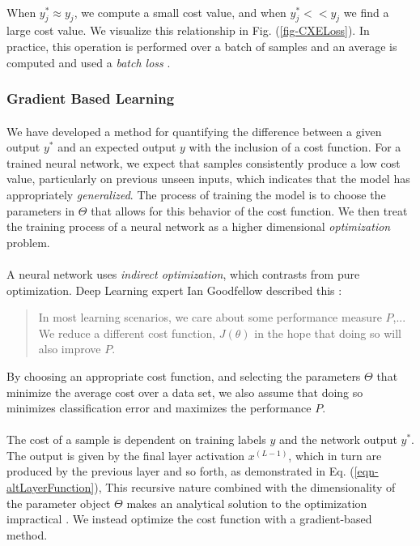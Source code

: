 \documentclass[12pt,letterpaper]{article}
\begin{document}
\paragraph*{}When $y^*_j \approx y_j$, we compute a small cost value, and when $y^*_j << y_j$ we find a large cost value. We visualize this relationship in Fig. (\ref{fig-CXELoss}). In practice, this operation is performed over a batch of samples and an average is computed and used a \textit{batch loss} \cite{Goodfellow}.


\subsubsection{Gradient Based Learning}

\paragraph*{}We have developed a method for quantifying the difference between a given output $y^*$ and an expected output $y$ with the inclusion of a cost function. For a trained neural network, we expect that samples consistently produce a low cost value, particularly on previous unseen inputs, which indicates that the model has appropriately \textit{generalized}. The process of training the model is to choose the parameters in $\Theta$ that allows for this behavior of the cost function. We then treat the training process of a neural network as a higher dimensional \textit{optimization} problem.

\paragraph*{}A neural network uses \textit{indirect optimization}, which contrasts from pure optimization. Deep Learning expert Ian Goodfellow described this \cite{Goodfellow}:
\begin{quote}
In most learning scenarios, we care about some performance measure $P$,... We reduce a different cost function, $J(\theta)$ in the hope that doing so will also improve $P$.
\end{quote}
By choosing an appropriate cost function, and selecting the parameters $\Theta$ that minimize the average cost over a data set, we also assume that doing so minimizes classification error and maximizes the performance $P$.

\paragraph*{}The cost of a sample is dependent on training labels $y$ and the network output $y^*$. The output is given by the final layer activation $x^{(L-1)}$, which in turn are produced by the previous layer and so forth, as demonstrated in Eq. (\ref{eqn-altLayerFunction}), This recursive nature combined with the dimensionality of the parameter object $\Theta$ makes an analytical solution to the optimization impractical \cite{Geron,Goodfellow,James}. We instead optimize the cost function with a gradient-based method. 
\end{document}
